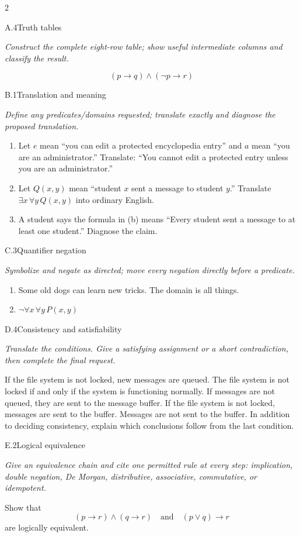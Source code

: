 \documentclass[9pt]{extarticle}
\begin{document}
\begin{multicols}{2}
\begin{CoreProblem}{A.4}{Truth tables}
{\scriptsize\textit{Construct the complete eight-row table; show useful intermediate columns and classify the result.}\par}
\[
  (p\to q)\land(\neg p\to r)
\]
\end{CoreProblem}
\begin{CoreProblem}{B.1}{Translation and meaning}
{\scriptsize\textit{Define any predicates/domains requested; translate exactly and diagnose the proposed translation.}\par}
\begin{enumerate}[label=(\alph*)]
  \item Let $e$ mean ``you can edit a protected encyclopedia entry'' and $a$
        mean ``you are an administrator.'' Translate: ``You cannot edit a
        protected entry unless you are an administrator.''
  \item Let $Q(x,y)$ mean ``student $x$ sent a message to student $y$.''
        Translate $\exists x\,\forall y\,Q(x,y)$ into ordinary English.
  \item A student says the formula in (b) means ``Every student sent a message
        to at least one student.'' Diagnose the claim.
\end{enumerate}
\end{CoreProblem}
\begin{CoreProblem}{C.3}{Quantifier negation}
{\scriptsize\textit{Symbolize and negate as directed; move every negation directly before a predicate.}\par}
\begin{enumerate}[label=(\alph*)]
  \item Some old dogs can learn new tricks. The domain is all things.
  \item $\neg\forall x\,\forall y\,P(x,y)$
\end{enumerate}
\end{CoreProblem}
\columnbreak
\begin{CoreProblem}{D.4}{Consistency and satisfiability}
{\scriptsize\textit{Translate the conditions. Give a satisfying assignment or a short contradiction, then complete the final request.}\par}
If the file system is not locked, new messages are queued. The file system is
not locked if and only if the system is functioning normally. If messages are
not queued, they are sent to the message buffer. If the file system is not
locked, messages are sent to the buffer. Messages are not sent to the buffer.
In addition to deciding consistency, explain which conclusions follow from the
last condition.
\end{CoreProblem}
\begin{CoreProblem}{E.2}{Logical equivalence}
{\scriptsize\textit{Give an equivalence chain and cite one permitted rule at every step: implication, double negation, De Morgan, distributive, associative, commutative, or idempotent.}\par}
Show that
\[
  (p\to r)\land(q\to r)
  \quad\text{and}\quad
  (p\lor q)\to r
\]
are logically equivalent.
\end{CoreProblem}
\end{multicols}
\end{document}
